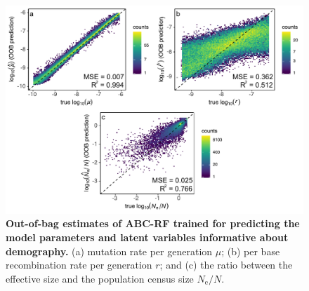\documentclass[a4paper, 12pt]{article}
\begin{document}
\begin{figure}[ht]
 \centering
 \includegraphics[width=1\textwidth]{Figures/FigureS3_oob_plots_demography.pdf}
 \small\caption{\textbf{Out-of-bag estimates of ABC-RF trained for predicting the model parameters and latent variables informative about demography.} (a) mutation rate per generation $\mu$; (b) per base recombination rate per generation $r$; and (c) the ratio between the effective size and the population census size $N_{\mathrm{e}}/N$.}\label{fig:supple_oob_demo}
\end{figure}
\end{document}
